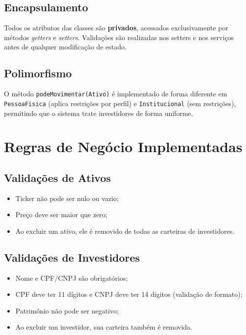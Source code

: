 \documentclass[11pt, a4paper]{article}
\begin{document}
\subsection{Encapsulamento}

Todos os atributos das classes são \textbf{privados}, acessados exclusivamente por métodos \textit{getters} e \textit{setters}. Validações são realizadas nos setters e nos serviços antes de qualquer modificação de estado.

\subsection{Polimorfismo}

O método \texttt{podeMovimentar(Ativo)} é implementado de forma diferente em \texttt{PessoaFisica} (aplica restrições por perfil) e \texttt{Institucional} (sem restrições), permitindo que o sistema trate investidores de forma uniforme.

\section{Regras de Negócio Implementadas}

\subsection{Validações de Ativos}
\begin{itemize}[noitemsep]
    \item Ticker não pode ser nulo ou vazio;
    \item Preço deve ser maior que zero;
    \item Ao excluir um ativo, ele é removido de todas as carteiras de investidores.
\end{itemize}

\subsection{Validações de Investidores}
\begin{itemize}[noitemsep]
    \item Nome e CPF/CNPJ são obrigatórios;
    \item CPF deve ter 11 dígitos e CNPJ deve ter 14 dígitos (validação de formato);
    \item Patrimônio não pode ser negativo;
    \item Ao excluir um investidor, sua carteira também é removida.
\end{itemize}
\end{document}
